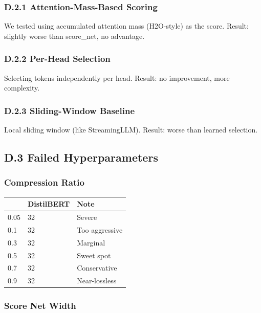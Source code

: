 \subsubsection{D.2.1 Attention-Mass-Based Scoring}

We tested using accumulated attention mass (H2O-style) as the score. Result: 
slightly worse than score\_net, no advantage.

\subsubsection{D.2.2 Per-Head Selection}

Selecting tokens independently per head. Result: no improvement, more 
complexity.

\subsubsection{D.2.3 Sliding-Window Baseline}

Local sliding window (like StreamingLLM). Result: worse than learned selection.

\subsection{D.3 Failed Hyperparameters}

\subsubsection{Compression Ratio}

\begin{table}[H]
\centering
\small
\begin{tabular}{lll}
\toprule
\textbf{} & \textbf{DistilBERT} & \textbf{Note} \\
\midrule
0.05 & 32 & Severe \\
0.1 & 32 & Too aggressive \\
0.3 & 32 & Marginal \\
0.5 & 32 & Sweet spot \\
0.7 & 32 & Conservative \\
0.9 & 32 & Near-lossless \\
\bottomrule
\end{tabular}
\end{table}

\subsubsection{Score Net Width}

